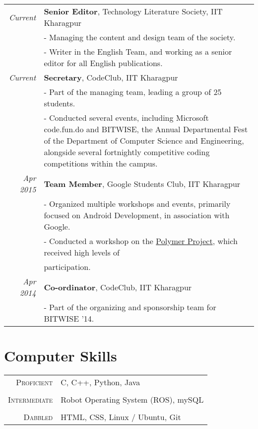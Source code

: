 \documentclass[a4paper,10pt]{article} %
\begin{document}
\begin{tabular}{rp{11cm}}
\emph{Current} & \textbf{Senior Editor}, Technology Literature Society, IIT Kharagpur \\
& \footnotesize{- Managing the content and design team of the society.}\\
& \footnotesize{- Writer in the English Team, and working as a senior editor for all English publications.}\\
\emph{Current} & \textbf{Secretary}, CodeClub, IIT Kharagpur \\
& \footnotesize{- Part of the managing team, leading a group of 25 students.}\\
& \footnotesize{- Conducted several events, including Microsoft code.fun.do and BITWISE, the Annual Departmental Fest of the Department of Computer Science and Engineering, alongside several fortnightly competitive coding competitions within the campus.}\\
\emph{Apr 2015} & \textbf{Team Member}, Google Students Club, IIT Kharagpur \\
& \footnotesize{- Organized multiple workshops and events, primarily focused on Android Development, in association with Google.}\\
& \footnotesize{- Conducted a workshop on the {\href{https://www.polymer-project.org/0.5/}{Polymer Project}}, which received high levels of}\\ & \footnotesize{participation.}\\
\emph{Apr 2014} & \textbf{Co-ordinator}, CodeClub, IIT Kharagpur \\
& \footnotesize{- Part of the organizing and sponsorship team for BITWISE '14.}\\
\end{tabular}


\section{Computer Skills}

\begin{tabular}{r|p{11cm}}
\textsc{Proficient} & C, C++, Python, Java\\
\multicolumn{2}{c}{} \\
\textsc{Intermediate} &  Robot Operating System (ROS), mySQL\\
\multicolumn{2}{c}{} \\
\textsc{Dabbled} & HTML, CSS, Linux / Ubuntu, Git\\
\end{tabular}
\end{document}
